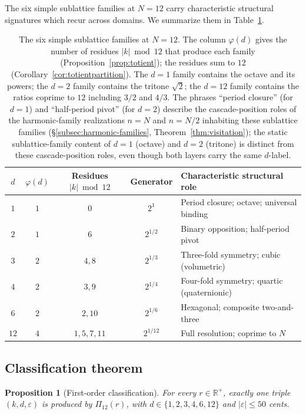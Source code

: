 \documentclass[11pt,a4paper]{article}
\newtheorem{proposition}[theorem]{Proposition}
\theoremstyle{definition}
\theoremstyle{remark}
\newcommand{\R}{\mathbb{R}}
\newcommand{\eps}{\varepsilon}
\begin{document}
The six simple sublattice families at $N=12$ carry characteristic structural signatures which recur across domains. We summarize them in Table~\ref{tab:families}.

\begin{table}[h]
\centering
\begin{tabular}{@{}c c c c l@{}}
\toprule
$d$ & $\varphi(d)$ & Residues $|k|\bmod 12$ & Generator & Characteristic structural role\\
\midrule
$1$ & $1$ & $0$ & $2^{1}$ & Period closure; octave; universal binding\\
$2$ & $1$ & $6$ & $2^{1/2}$ & Binary opposition; half-period pivot\\
$3$ & $2$ & $4,8$ & $2^{1/3}$ & Three-fold symmetry; cubic (volumetric)\\
$4$ & $2$ & $3,9$ & $2^{1/4}$ & Four-fold symmetry; quartic (quaternionic)\\
$6$ & $2$ & $2,10$ & $2^{1/6}$ & Hexagonal; composite two-and-three\\
$12$ & $4$ & $1,5,7,11$ & $2^{1/12}$ & Full resolution; coprime to $N$\\
\bottomrule
\end{tabular}
\caption{The six simple sublattice families at $N=12$. The column $\varphi(d)$ gives the number of residues $|k|\bmod 12$ that produce each family (Proposition~\ref{prop:totient}); the residues sum to $12$ (Corollary~\ref{cor:totientpartition}). The $d=1$ family contains the octave and its powers; the $d=2$ family contains the tritone $\sqrt{2}$; the $d=12$ family contains the ratios coprime to $12$ including $3/2$ and $4/3$. The phrases ``period closure'' (for $d=1$) and ``half-period pivot'' (for $d=2$) describe the cascade-position roles of the harmonic-family realizations $n=N$ and $n=N/2$ inhabiting these sublattice families (\S\ref{subsec:harmonic-families}, Theorem~\ref{thm:visitation}); the static sublattice-family content of $d=1$ (octave) and $d=2$ (tritone) is distinct from these cascade-position roles, even though both layers carry the same $d$-label.}
\label{tab:families}
\end{table}

\subsection{Classification theorem}

\begin{proposition}[First-order classification]\label{prop:classification}
For every $r\in\R^{+}$, exactly one triple $(k,d,\eps)$ is produced by $\Pi_{12}(r)$, with $d\in\{1,2,3,4,6,12\}$ and $|\eps|\le 50$ cents.
\end{proposition}
\end{document}
